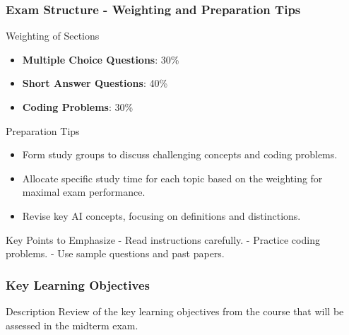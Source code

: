 \documentclass[aspectratio=169]{beamer}
\begin{document}
\begin{frame}[fragile]
    \frametitle{Exam Structure - Weighting and Preparation Tips}
    \begin{block}{Weighting of Sections}
        \begin{itemize}
            \item \textbf{Multiple Choice Questions}: 30\% 
            \item \textbf{Short Answer Questions}: 40\%
            \item \textbf{Coding Problems}: 30\%
        \end{itemize}
    \end{block}

    \begin{block}{Preparation Tips}
        \begin{itemize}
            \item Form study groups to discuss challenging concepts and coding problems.
            \item Allocate specific study time for each topic based on the weighting for maximal exam performance.
            \item Revise key AI concepts, focusing on definitions and distinctions.
        \end{itemize}
    \end{block}

    \begin{block}{Key Points to Emphasize}
        - Read instructions carefully.
        - Practice coding problems.
        - Use sample questions and past papers.
    \end{block}
\end{frame}

\begin{frame}[fragile]
    \frametitle{Key Learning Objectives}
    \begin{block}{Description}
        Review of the key learning objectives from the course that will be assessed in the midterm exam.
    \end{block}
\end{frame}
\end{document}
